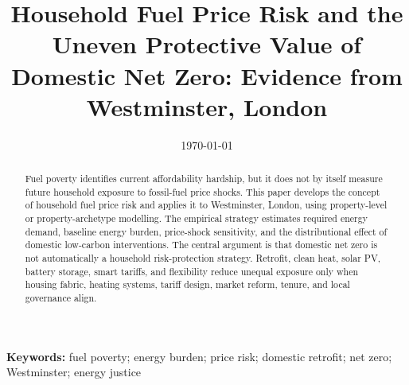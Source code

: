 \documentclass[11pt,a4paper]{article}
\title{Household Fuel Price Risk and the Uneven Protective Value of Domestic Net Zero: Evidence from Westminster, London}
\author{}
\date{\today}
\begin{document}
\maketitle

\begin{abstract}
Fuel poverty identifies current affordability hardship, but it does not by itself measure future household exposure to fossil-fuel price shocks. This paper develops the concept of household fuel price risk and applies it to Westminster, London, using property-level or property-archetype modelling. The empirical strategy estimates required energy demand, baseline energy burden, price-shock sensitivity, and the distributional effect of domestic low-carbon interventions. The central argument is that domestic net zero is not automatically a household risk-protection strategy. Retrofit, clean heat, solar PV, battery storage, smart tariffs, and flexibility reduce unequal exposure only when housing fabric, heating systems, tariff design, market reform, tenure, and local governance align.
\end{abstract}

\noindent\textbf{Keywords:} fuel poverty; energy burden; price risk; domestic retrofit; net zero; Westminster; energy justice









% 
% 
\end{document}
